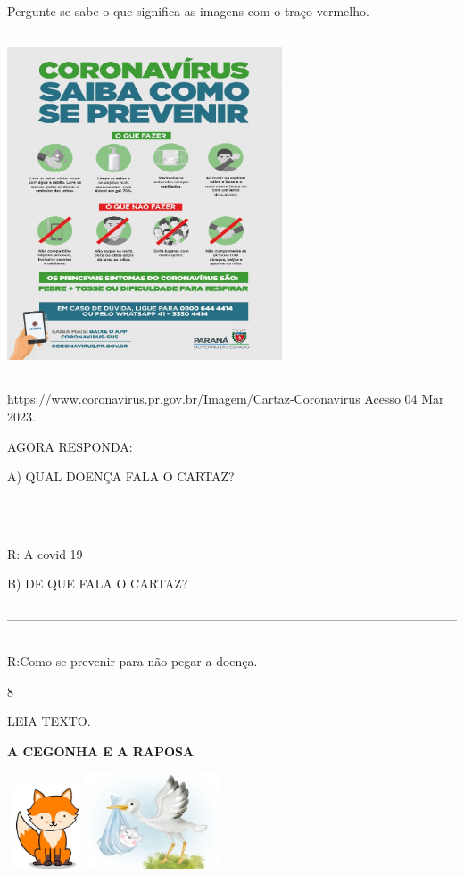 {{{{{Pergunte se sabe o que significa as imagens com o traço vermelho.

\includegraphics[width=3.20896in,height=3.98057in]{media/image120.jpeg}

\url{https://www.coronavirus.pr.gov.br/Imagem/Cartaz-Coronavirus} Acesso
04 Mar 2023.

AGORA RESPONDA:

A) QUAL DOENÇA FALA O CARTAZ?

\_\_\_\_\_\_\_\_\_\_\_\_\_\_\_\_\_\_\_\_\_\_\_\_\_\_\_\_\_\_\_\_\_\_\_\_\_\_\_\_\_\_\_\_\_\_\_\_\_\_\_\_\_\_\_\_\_\_\_\_\_\_\_\_\_\_\_\_\_\_\_\_\_\_

R: A covid 19

B) DE QUE FALA O CARTAZ?

\_\_\_\_\_\_\_\_\_\_\_\_\_\_\_\_\_\_\_\_\_\_\_\_\_\_\_\_\_\_\_\_\_\_\_\_\_\_\_\_\_\_\_\_\_\_\_\_\_\_\_\_\_\_\_\_\_\_\_\_\_\_\_\_\_\_\_\_\_\_\_\_\_\_

R:Como se prevenir para não pegar a doença.

\num{8}

LEIA TEXTO.

\textbf{A CEGONHA E A RAPOSA}

\includegraphics[width=0.90625in,height=0.98597in]{media/image121.jpeg}\includegraphics[width=1.57292in,height=1.12292in]{media/image122.jpeg}

}}}}}

